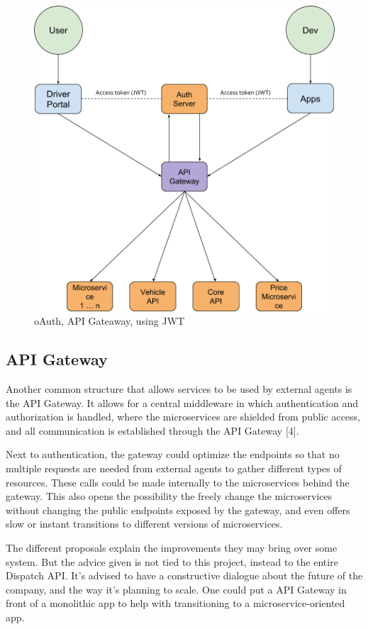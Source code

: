 \begin{figure}[ht!]
	\centering
	\includegraphics[width=.7\textwidth]{OAuth}
	\caption[Architecture]{oAuth, API Gateaway, using JWT}
	\label{fig:oAuth}
\end{figure}
\clearpage

\subsection{API Gateway}

Another common structure that allows services to be used by external agents is the API Gateway. It allows for a central middleware in which authentication and authorization is handled, where the microservices are shielded from public access, and all communication is established through the API Gateway [4].

Next to authentication, the gateway could optimize the endpoints so that no multiple requests are needed from external agents to gather different types of resources. These calls could be made internally to the microservices behind the gateway. This also opens the possibility the freely change the microservices without changing the public endpoints exposed by the gateway, and even offers slow or instant transitions to different versions of microservices.

The different proposals explain the improvements they may bring over some system. But the advice given is not tied to this project, instead to the entire Dispatch API. It’s advised to have a constructive dialogue about the future of the company, and the way it’s planning to scale. One could put a API Gateway in front of a monolithic app to help with transitioning to a microservice-oriented app.
